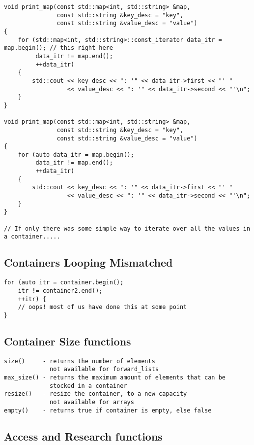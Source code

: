 \begin{verbatim}
void print_map(const std::map<int, std::string> &map,
               const std::string &key_desc = "key",
               const std::string &value_desc = "value")
{
    for (std::map<int, std::string>::const_iterator data_itr = map.begin(); // this right here
         data_itr != map.end();
         ++data_itr)
    {
        std::cout << key_desc << ": '" << data_itr->first << "' "
                  << value_desc << ": '" << data_itr->second << "'\n";
    }
}

void print_map(const std::map<int, std::string> &map,
               const std::string &key_desc = "key",
               const std::string &value_desc = "value")
{
    for (auto data_itr = map.begin();
         data_itr != map.end();
         ++data_itr)
    {
        std::cout << key_desc << ": '" << data_itr->first << "' "
                  << value_desc << ": '" << data_itr->second << "'\n";
    }
}

// If only there was some simple way to iterate over all the values in a container.....
\end{verbatim}

\subsection{Containers Looping Mismatched}

\begin{verbatim}
for (auto itr = container.begin();
    itr != container2.end();
    ++itr) {
    // oops! most of us have done this at some point
}
\end{verbatim}

\subsection{Container Size functions}

\begin{verbatim}
size()     - returns the number of elements
             not available for forward_lists
max_size() - returns the maximum amount of elements that can be
             stocked in a container
resize()   - resize the container, to a new capacity
             not available for arrays
empty()    - returns true if container is empty, else false
\end{verbatim}

\subsection{Access and Research functions}

